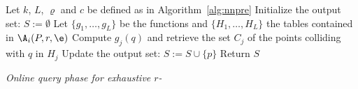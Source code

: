 \begin{algorithm}[!hbt]
\LinesNumbered


\BlankLine

  Let $k$, $L$, $\varrho$  and $c$ be defined as in Algorithm~\ref{alg:nnpre}\;
  Initialize the output set: $S:=\emptyset$\;
   {
    Let  $\{g_1,\ldots,g_{L}\}$ be the functions and
    $\{H_1,\ldots,H_{L}\}$ the tables contained in $\A_i(P, r,\e)$\;
     {
      Compute $g_j(q)$ and retrieve the set $C_j$ of the points colliding with $q$ in $H_j$\;
       {
         {
          Update the output set:
          $S := S\cup\{p\}$\;
        }
      }
    }
  }
  Return $S$\;


  \caption{\em Online query phase for exhaustive $r$-\pleb}
  \label{alg:nnquery}
\end{algorithm}


